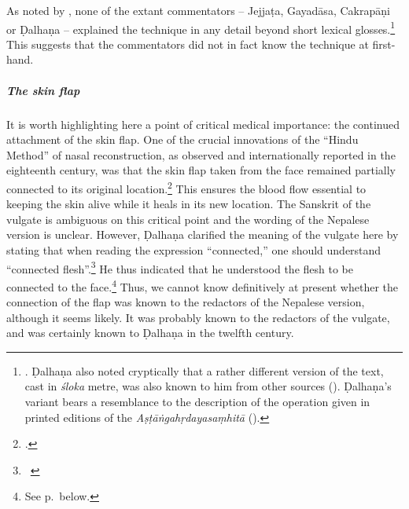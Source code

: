 As noted by \citeauthor{meul-hist}, none of the extant commentators -- Jejjaṭa,
Gayadāsa, Cakrapāṇi or Ḍalhaṇa -- explained the technique in any detail beyond short
lexical glosses.\footnote{\cite[IB, 328]{meul-hist}. Ḍalhaṇa also noted
cryptically that a rather different version of the text, cast in \emph{śloka}
metre, was also known to him from other sources (). 
Ḍalhaṇa's variant bears a resemblance to the description of the operation given in
printed editions of the \emph{Aṣṭāṅgahṛdayasaṃhitā} 
().}
This suggests that the commentators did not in fact know the technique at
first-hand.

\subparagraph{The skin flap} It is worth highlighting here a point of critical
medical importance: the continued attachment of the skin flap. One of the crucial
innovations of the “Hindu Method” of nasal reconstruction, as observed  and
internationally reported in the eighteenth century, was that the skin flap taken
from the face remained partially connected to its original
location.\footcite[See][67--70]{wuja-2003} This ensures the blood flow essential
to keeping the skin alive while it heals in its new location.  The Sanskrit of the
vulgate is ambiguous on this critical point and the wording of the Nepalese
version is unclear. However, Ḍalhaṇa clarified the meaning of the vulgate here by
stating that when reading the expression “connected,” one should understand
“connected flesh”.\footnote{\SS\ }  He thus indicated that he
    understood the flesh to be connected to the face.\footnote{See
        p.\,\pageref{well-joined} below.}  Thus, we cannot know definitively at present
        whether the connection of the flap was known to the redactors of the Nepalese
        version, although it seems likely.  It was probably known to the redactors of the
        vulgate, and was certainly known to Ḍalhaṇa in the twelfth century.
        
